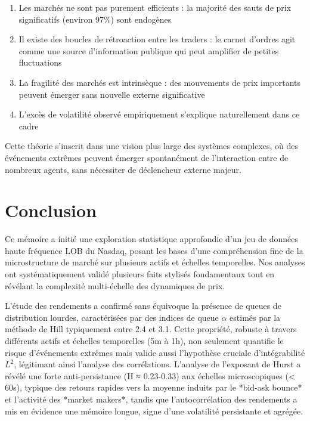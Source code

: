 \documentclass[10pt,a4paper]{article}
\theoremstyle{definition}
\theoremstyle{remark}
\begin{document}
\begin{itemize}
\begin{enumerate}
    \item Les marchés ne sont pas purement efficients : la majorité des sauts de prix significatifs (environ 97\%) sont endogènes
    \item Il existe des boucles de rétroaction entre les traders : le carnet d'ordres agit comme une source d'information publique qui peut amplifier de petites fluctuations
    \item La fragilité des marchés est intrinsèque : des mouvements de prix importants peuvent émerger sans nouvelle externe significative
    \item L'excès de volatilité observé empiriquement s'explique naturellement dans ce cadre
\end{enumerate}

Cette théorie s'inscrit dans une vision plus large des systèmes complexes, où des événements extrêmes peuvent émerger spontanément de l'interaction entre de nombreux agents, sans nécessiter de déclencheur externe majeur.

\newpage
\section*{Conclusion}

Ce mémoire a initié une exploration statistique approfondie d'un jeu de données haute fréquence LOB du Nasdaq, posant les bases d'une compréhension fine de la microstructure de marché sur plusieurs actifs et échelles temporelles. Nos analyses ont systématiquement validé plusieurs faits stylisés fondamentaux tout en révélant la complexité multi-échelle des dynamiques de prix.

L'étude des rendements a confirmé sans équivoque la présence de queues de distribution lourdes, caractérisées par des indices de queue $\alpha$ estimés par la méthode de Hill typiquement entre 2.4 et 3.1. Cette propriété, robuste à travers différents actifs et échelles temporelles (5m à 1h), non seulement quantifie le risque d'événements extrêmes mais valide aussi l'hypothèse cruciale d'intégrabilité $L^2$, légitimant ainsi l'analyse des corrélations. L'analyse de l'exposant de Hurst a révélé une forte anti-persistance (H ≈ 0.23-0.33) aux échelles microscopiques (< 60s), typique des retours rapides vers la moyenne induits par le *bid-ask bounce* et l'activité des *market makers*, tandis que l'autocorrélation des rendements a mis en évidence une mémoire longue, signe d'une volatilité persistante et agrégée.


\end{itemize}
\end{document}
